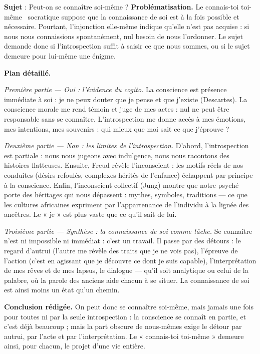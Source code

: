 \documentclass[11pt]{article}
\begin{document}
\begin{exoresolu}
\textbf{Sujet} : Peut-on se connaître soi-même ?
\tcblower
\textbf{Problématisation.} Le \guillemotleft connais-toi toi-même \guillemotright\ socratique suppose que la connaissance de soi est à la fois possible et nécessaire. Pourtant, l'injonction elle-même indique qu'elle n'est pas acquise : si nous nous connaissions spontanément, nul besoin de nous l'ordonner. Le sujet demande donc si l'introspection suffit à saisir ce que nous sommes, ou si le sujet demeure pour lui-même une énigme.

\textbf{Plan détaillé.}

\emph{Première partie — Oui : l'évidence du cogito.} La conscience est présence immédiate à soi : je ne peux douter que je pense et que j'existe (Descartes). La conscience morale me rend témoin et juge de mes actes : nul ne peut être responsable sans se connaître. L'introspection me donne accès à mes émotions, mes intentions, mes souvenirs : qui mieux que moi sait ce que j'éprouve ?

\emph{Deuxième partie — Non : les limites de l'introspection.} D'abord, l'introspection est partiale : nous nous jugeons avec indulgence, nous nous racontons des histoires flatteuses. Ensuite, Freud révèle l'inconscient : les motifs réels de nos conduites (désirs refoulés, complexes hérités de l'enfance) échappent par principe à la conscience. Enfin, l'inconscient collectif (Jung) montre que notre psyché porte des héritages qui nous dépassent : mythes, symboles, traditions — ce que les cultures africaines expriment par l'appartenance de l'individu à la lignée des ancêtres. Le « je » est plus vaste que ce qu'il sait de lui.

\emph{Troisième partie — Synthèse : la connaissance de soi comme tâche.} Se connaître n'est ni impossible ni immédiat : c'est un travail. Il passe par des détours : le regard d'autrui (l'autre me révèle des traits que je ne vois pas), l'épreuve de l'action (c'est en agissant que je découvre ce dont je suis capable), l'interprétation de mes rêves et de mes lapsus, le dialogue — qu'il soit analytique ou celui de la palabre, où la parole des anciens aide chacun à se situer. La connaissance de soi est ainsi moins un état qu'un chemin.

\textbf{Conclusion rédigée.} On peut donc se connaître soi-même, mais jamais une fois pour toutes ni par la seule introspection : la conscience se connaît en partie, et c'est déjà beaucoup ; mais la part obscure de nous-mêmes exige le détour par autrui, par l'acte et par l'interprétation. Le « connais-toi toi-même » demeure ainsi, pour chacun, le projet d'une vie entière.
\end{exoresolu}
\end{document}
